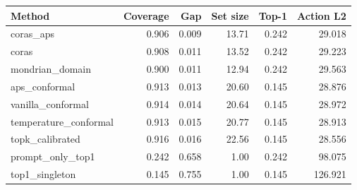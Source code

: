 \begin{tabular}{lrrrrr}
\toprule
Method & Coverage & Gap & Set size & Top-1 & Action L2 \\
\midrule
coras\_aps & 0.906 & 0.009 & 13.71 & 0.242 & 29.018 \\
coras & 0.908 & 0.011 & 13.52 & 0.242 & 29.223 \\
mondrian\_domain & 0.900 & 0.011 & 12.94 & 0.242 & 29.563 \\
aps\_conformal & 0.913 & 0.013 & 20.60 & 0.145 & 28.876 \\
vanilla\_conformal & 0.914 & 0.014 & 20.64 & 0.145 & 28.972 \\
temperature\_conformal & 0.913 & 0.015 & 20.77 & 0.145 & 28.913 \\
topk\_calibrated & 0.916 & 0.016 & 22.56 & 0.145 & 28.556 \\
prompt\_only\_top1 & 0.242 & 0.658 & 1.00 & 0.242 & 98.075 \\
top1\_singleton & 0.145 & 0.755 & 1.00 & 0.145 & 126.921 \\
\bottomrule
\end{tabular}